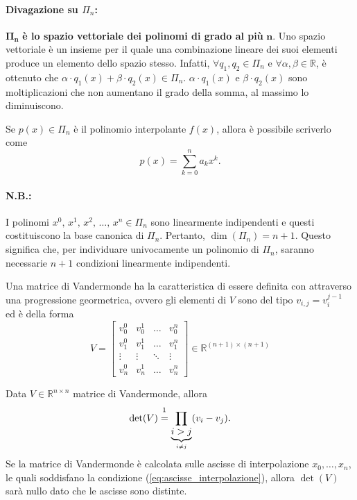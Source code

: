 \paragraph{Divagazione su $\Pi_n$:}{
$\boldsymbol{\Pi_n}$ \textbf{è lo spazio vettoriale dei polinomi di grado al più} $\boldsymbol n$. Uno spazio vettoriale è un insieme per il quale una combinazione lineare dei suoi elementi produce un elemento dello spazio stesso.
Infatti, $\forall q_1, q_2\in\Pi_n$ e $\forall \alpha,\beta\in\mathbb R$, è ottenuto che $\alpha \cdot q_1(x)+\beta\cdot q_2(x)\in\Pi_n$. $\alpha \cdot q_1(x)$ e $\beta\cdot q_2(x)$ sono moltiplicazioni che non aumentano il grado della somma, al massimo lo diminuiscono.

Se $p(x)\in\Pi_n$ è il polinomio interpolante $f(x)$, allora è possibile scriverlo come
\begin{equation}\label{eq:polinomio_generico}
    p(x)=\sum_{k=0}^{n}a_kx^k.
\end{equation}

\paragraph{N.B.:} I polinomi $x^0,\, x^1,\, x^2,\, \hdots,\, x^n\in\Pi_n$ sono linearmente indipendenti e questi costituiscono la base canonica di $\Pi_n$. Pertanto, $\dim(\Pi_n)=n+1$. Questo significa che, per individuare univocamente un polinomio di $\Pi_n$,  saranno necessarie $n+1$ condizioni linearmente indipendenti.}

 \begin{definition}
	Una matrice di Vandermonde ha la caratteristica di essere definita con attraverso una progressione geormetrica, ovvero gli elementi di $V$ sono del tipo $v_{i,j}=v_i^{j-1}$ ed è della forma
	 \begin{equation*}
	 	V=\begin{bmatrix}
	 		v_0^0 & v_0^1 & \hdots & v_0^n\\
	 		v_1^0 & v_1^1 & \hdots & v_1^n\\
	 		\vdots & \vdots &\ddots & \vdots\\
	 		v_n^0 & v_n^1 & \hdots & v_n^n
	 	\end{bmatrix}\in\mathbb R^{(n+1)\times (n+1)}
	 \end{equation*}
\end{definition}

\begin{property}\label{prop:determinante_matrice_vandermonde}
	Data $V\in\mathbb{R}^{n\times n}$ matrice di Vandermonde, allora
	\begin{equation}\label{eq:determinante_matrice_vandermonde}
		\det(V)\overset{\footnotemark}{=}\prod_{\underbrace{i>j}_{i\neq j}}(v_i-v_j).
	\end{equation}
	Se la matrice di Vandermonde è calcolata sulle ascisse di interpolazione $x_0, \hdots, x_n$, le quali soddisfano la condizione (\ref{eq:ascisse_interpolazione}), allora $\det(V)$ sarà nullo dato che le ascisse sono distinte.
\end{property}

